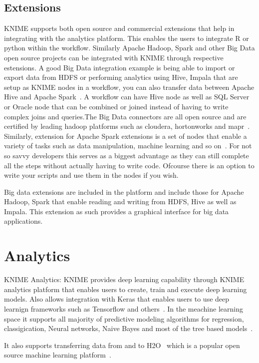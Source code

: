 \subsection{Extensions}
KNIME supports both open source and commercial extensions that help in
integrating with the analytics platform. This enables the users to integrate R
or python within the workflow. Similarly Apache Hadoop, Spark and other Big Data
open source projects can be integrated with KNIME through respective
estensions. A good Big Data integration example is being able to import or
export data from HDFS or performing analytics using Hive, Impala that are setup
as KNIME nodes in a workflow, you can also transfer data between Apache Hive and
Apache Spark~\cite{hid-sp18-517-ksw}. A workflow can have Hive node as well as
SQL Server or Oracle node that can be combined or joined instead of having to
write complex joins and queries.The Big Data connectors are all open source and
are certified by leading hadoop platforms such as cloudera, hortonworks and
mapr~\cite{hid-sp18-517-bde}.  Similarly, extension for Apache Spark extensions
is a set of nodes that enable a variety of tasks such as data manipulation,
machine learning and so on~\cite{hid-sp18-517-spark}.  For not so savvy
developers this serves as a biggest advantage as they can still complete all the
steps without actually having to write code. Ofcourse there is an option to
write your scripts and use them in the nodes if you wish.


Big data extensions are included in the platform and include those for Apache
Hadoop, Spark that enable reading and writing from HDFS, Hive as well as
Impala. This extension as such provides a graphical interface for big data
applications.

\section{Analytics}
KNIME Analytics: KNIME provides deep learning capability through KNIME analytics
platform that enables users to create, train and execute deep learning
models. Also allows integration with Keras that enables users to use deep
learnign frameworks such as Tensorflow and others~\cite{hid-sp18-517-dl}. In the
meachine learning space it supports all majority of predictive modeling
algorithms for regression, classigication, Neural networks, Naive Bayes and most
of the tree based models~\cite{hid-sp18-517-pml}.

It also supports transferring data from and to H2O~\cite{hid-sp18-517-h20}
which is a popular open source machine learning
platform~\cite{hid-sp18-517-knimeh20}.

